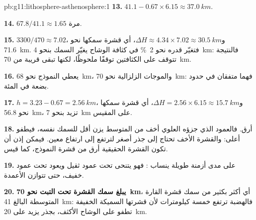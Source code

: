 \begin{solution}{pb:g11:lithosphere-asthenosphere:1}
\textbf{13.} $41.1 - 0.67 \times 6.15 \approx \qty{37.0}{km}$.

\textbf{14.} $67.8/41.1 \approx 1.65$ مرة.

\textbf{15.} $3300/470 \approx 7.02$، و$\Delta H \approx 4.34 \times 7.02
\approx \qty{30.5}{km}$، أي قشرة سمكها نحو \qty{71.6}{km}. فتغيّر قدره
نحو \qty{2}{\percent} في كثافة الوشاح يغيّر السمك بنحو
\qty{4}{km}: فالنتيجة تتوقف على الكثافتين توقفًا ملحوظًا، لكنها تبقى
قريبة من \qty{70}{km}.

\textbf{16.} يعطي النموذج نحو \qty{68}{km}، والموجات الزلزالية نحو
\qty{70}{km}: فهما متفقان في حدود بضعة في المئة.

\textbf{17.} $h = 3.23 - 0.67 = \qty{2.56}{km}$، و$\Delta H = 2.56 \times
6.15 \approx \qty{15.7}{km}$، أي قشرة سمكها نحو \qty{56.8}{km}، تزيد بنحو
\qty{7}{km} على المقيس.

\textbf{18.} أرق. فالعمود الذي جزؤه العلوي أخف من المتوسط
يزن أقل للسمك نفسه، فيطفو أعلى: والقشرة الأخف
تحتاج إلى جذر أصغر لترتفع إلى ارتفاع معين. فيمكن إذن أن تكون القشرة الحقيقية
أرق من قشرة النموذج، كما قيس.

\textbf{19.} على مدى أزمنة طويلة ينساب : فهو يتنحى تحت
عمود ثقيل ويعود تحت عمود خفيف، حتى تتوازن الأعمدة.

\textbf{20.} \textbf{يبلغ سمك القشرة تحت التبت نحو \qty{70}{km}}، أي أكثر
بكثير من سمك قشرة القارة المتوسطة البالغ \qty{41}{km}: فالهضبة ترتفع خمسة
كيلومترات لأن قشرتها السميكة الخفيفة تطفو على الوشاح الأكثف،
بجذر يزيد على \qty{20}{km}.
\end{solution}
